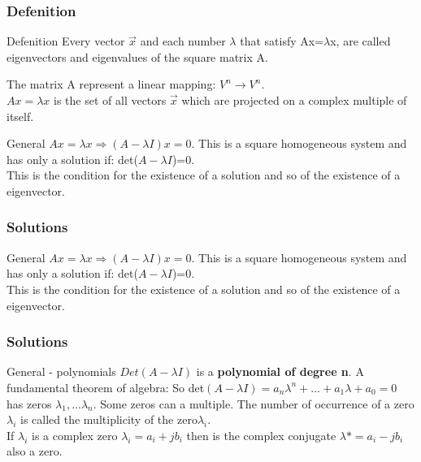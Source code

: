 \begin{frame}
	\frametitle{Defenition}
	\begin{block}{Defenition}
		Every vector $\overrightarrow{x}$ and each number $\lambda$ that satisfy  Ax=$\lambda$x, are called eigenvectors and eigenvalues of the square matrix A.\vspace{4mm}
		
		The matrix A represent a linear mapping: $V^n \rightarrow V^n$.\\
		$Ax=\lambda x$ is the set of all vectors $\overrightarrow{x}$ which are projected on a complex multiple of itself.
	\end{block}
	\begin{block}{General}
		$Ax=\lambda x \Rightarrow (A-\lambda I)x=0$. This is a square homogeneous system and has only a solution if: det($A-\lambda I$)=0.\\
		This is the condition for the existence of a solution and so of the existence of a eigenvector.
	\end{block}
\end{frame}

\begin{frame}
	\frametitle{Solutions}
	\begin{block}{General}
		$Ax=\lambda x \Rightarrow (A-\lambda I)x=0$. This is a square homogeneous system and has only a solution if: det($A-\lambda I$)=0.\\
		This is the condition for the existence of a solution and so of the existence of a eigenvector.
	\end{block}
\end{frame}

\begin{frame}
	\frametitle{Solutions}
	\begin{block}{General - polynomials}
		$Det(A-\lambda I)$ is a \textbf{polynomial of degree n}. A fundamental theorem of algebra: 
		\vspace{4mm}
		So det$(A-\lambda I)=a_n\lambda^n +...+a_1\lambda+a_0=0$ has zeros $\lambda_1,...\lambda_n$. Some zeros can a multiple. The number of occurrence of a zero $\lambda_i$ is called the multiplicity of the zero$\lambda_i$.\\
		If $\lambda_i$ is a complex zero $\lambda_i=a_i+jb_i$ then is the complex conjugate $\lambda*=a_i-jb_i$ also a zero.
	\end{block}
\end{frame}

